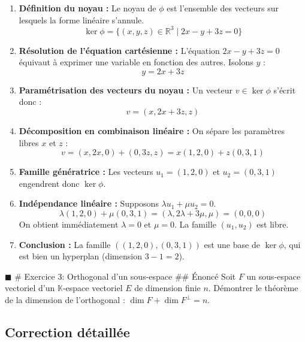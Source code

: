 \begin{enumerate}
\def\labelenumi{\arabic{enumi}.}
\tightlist
\item
  \textbf{Définition du noyau :} Le noyau de \(\phi\) est l'ensemble des
  vecteurs sur lesquels la forme linéaire s'annule.
  \[\ker \phi = \{ (x,y,z) \in \mathbb{R}^3 \mid 2x - y + 3z = 0 \}\]
\item
  \textbf{Résolution de l'équation cartésienne :} L'équation
  \(2x - y + 3z = 0\) équivaut à exprimer une variable en fonction des
  autres. Isolons \(y\) : \[y = 2x + 3z\]
\item
  \textbf{Paramétrisation des vecteurs du noyau :} Un vecteur
  \(v \in \ker \phi\) s'écrit donc : \[v = (x, 2x+3z, z)\]
\item
  \textbf{Décomposition en combinaison linéaire :} On sépare les
  paramètres libres \(x\) et \(z\) :
  \[v = (x, 2x, 0) + (0, 3z, z) = x(1, 2, 0) + z(0, 3, 1)\]
\item
  \textbf{Famille génératrice :} Les vecteurs \(u_1 = (1, 2, 0)\) et
  \(u_2 = (0, 3, 1)\) engendrent donc \(\ker \phi\).
\item
  \textbf{Indépendance linéaire :} Supposons
  \(\lambda u_1 + \mu u_2 = 0\).
  \[\lambda(1, 2, 0) + \mu(0, 3, 1) = (\lambda, 2\lambda+3\mu, \mu) = (0, 0, 0)\]
  On obtient immédiatement \(\lambda = 0\) et \(\mu = 0\). La famille
  \((u_1, u_2)\) est libre.
\item
  \textbf{Conclusion :} La famille \(((1,2,0), (0,3,1))\) est une base
  de \(\ker \phi\), qui est bien un hyperplan (dimension \(3 - 1 = 2\)).
\end{enumerate}

\(\blacksquare\) \# Exercice 3: Orthogonal d'un sous-espace \#\# Énoncé
Soit \(F\) un sous-espace vectoriel d'un \(\mathbb{K}\)-espace vectoriel
\(E\) de dimension finie \(n\). Démontrer le théorème de la dimension de
l'orthogonal : \(\dim F + \dim F^\perp = n\).

\hypertarget{correction-duxe9tailluxe9e-2}{%
\subsection{Correction détaillée}\label{correction-duxe9tailluxe9e-2}}

